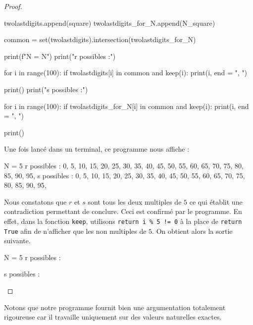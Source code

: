 \begin{proof}
\begin{rawcode}
    twolastdigits.append(square)
    twolastdigits_for_N.append(N_square)

common = set(twolastdigits).intersection(twolastdigits_for_N)


print(f"N = {N}")
print("r possibles :")

for i in range(100):
    if twolastdigits[i] in common and keep(i):
        print(i, end = ", ")

print()
print("s possibles :")

for i in range(100):
    if twolastdigits_for_N[i] in common and keep(i):
        print(i, end = ", ")

print()
	\end{rawcode}


	\medskip

	Une fois lancé dans un terminal, ce programme nous affiche :

	\begin{rawcode}
N = 5
r possibles :
0, 5, 10, 15, 20, 25, 30, 35, 40, 45, 50, 55, 60, 65, 70, 75, 80, 85, 90, 95,
s possibles :
0, 5, 10, 15, 20, 25, 30, 35, 40, 45, 50, 55, 60, 65, 70, 75, 80, 85, 90, 95,
	\end{rawcode}

	Nous constatons que $r$ et $s$ sont tous les deux multiples de $5$ ce qui établit une contradiction permettant de conclure.
	Ceci est confirmé par le programme.
	En effet, dans la fonction \verb+keep+, utilisons \verb+return i % 5 != 0+
	à la place de \verb+return True+ afin de n'afficher que les non multiples de $5$.
	On obtient alors la sortie suivante.

	\begin{rawcode}
N = 5
r possibles :

s possibles :

	\end{rawcode}
\end{proof}


\begin{remark}
	Notons que notre programme fournit bien une argumentation totalement rigoureuse car il travaille uniquement sur des valeurs naturelles exactes.
\end{remark}

